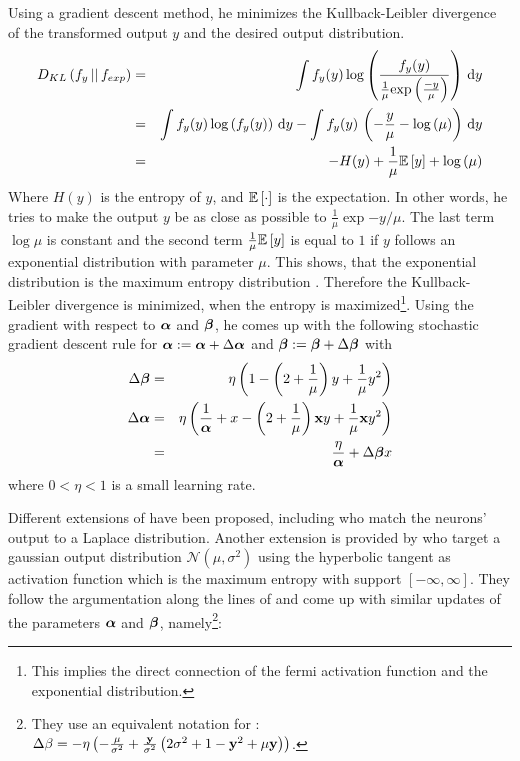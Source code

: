 Using a gradient descent method, he minimizes the Kullback-Leibler divergence of the transformed output $y$ and the desired output distribution. 
\begin{eqnarray}
    D_{KL} \left(f_y \,\vert\vert\, f_{exp}\right) & = & \int f_y(y) \, \text{log} \left(\frac{f_y(y)}{\frac{1}{\mu} \text{exp}\left( \frac{-y}{\mu} \right)}\right) \,\text{d} y\\
    & = & \int f_y(y) \, \text{log} \left(f_y(y)\right) \,\text{d} y - \int f_y(y) \, \left(-\frac{y}{\mu} - \text{log} \left(\mu\right)\right) \,\text{d} y \\
    & = & -H(y) + \frac{1}{\mu} \mathbb{E}\left[ y \right] +  \text{log} \left(\mu\right)
\end{eqnarray}
Where $H(y)$ is the entropy of $y$, and $\mathbb{E}\left[ \cdot \right]$ is the expectation. In other words, he tries to make the output $y$ be as close as possible to $\frac{1}{\mu} \exp{-y/\mu}$. The last term $\log{\mu}$ is constant and the second term $\frac{1}{\mu}\mathbb{E}\left[ y \right]$ is equal to $1$ if $y$ follows an exponential distribution with parameter $\mu$. This shows, that the exponential distribution is the maximum entropy distribution \citep{Triesch2005}. Therefore the Kullback-Leibler divergence is minimized, when the entropy is maximized\footnote{This implies the direct connection of the fermi activation function and the exponential distribution.}. Using the gradient with respect to ${{\bm \alpha}}$ and ${{\bm \beta}}$, he comes up with the following stochastic gradient descent rule for ${{\bm \alpha}} := {{\bm \alpha}} + \Delta{{\ensuremath \bm \alpha}}$ and ${{\bm \beta}} := {{\bm \beta}} + \Delta{{\ensuremath \bm \beta}}$ with
\begin{eqnarray}
    \Delta{{\ensuremath \bm \beta}} & = & \eta \left(1 - \left(2+ \frac{1}{\mu}\right)y + \frac{1}{\mu}y^2 \right) \\
    \Delta{{\ensuremath \bm \alpha}} & = & \eta \left(\frac{1}{{{\bm \alpha}}} + x - \left(2+ \frac{1}{\mu}\right){\bf x} y + \frac{1}{\mu}{\bf x} y^2\right) \\
    & = & \frac{\eta}{{{\bm \alpha}}} + \Delta{{\ensuremath \bm \beta}} x
\end{eqnarray}
where $0 < \eta < 1$ is a small learning rate. %


Different extensions of \cite{Triesch2005} have been proposed, including \cite{Boedecker2009SelfOrganized} who match the neurons' output to a Laplace distribution. Another extension is provided by \cite{Schrauwen2008} who target a gaussian output distribution $\mathcal{N}\left(\mu, \sigma^2\right)$ using the hyperbolic tangent as activation function which is the maximum entropy with support $\left[-\infty, \infty\right]$. They follow the argumentation along the lines of \cite{Triesch2005} and come up with similar updates of the parameters ${{\bm \alpha}}$ and ${{\bm \beta}}$, namely\footnote{They use an equivalent notation for : $\Delta\beta = - \eta \left(-\frac{\mu}{\sigma^2} + \frac{{\bf y}}{\sigma^2}\left(2\sigma^2 + 1 - {\bf y}^2 + \mu {\bf y}\right)\right)$.}:

